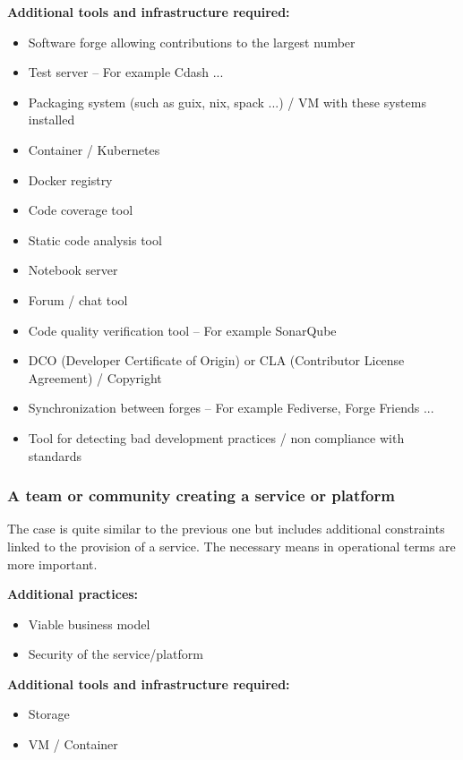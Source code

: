 {\bf Additional tools and infrastructure required:}
\begin{itemize}
\item Software forge allowing contributions to the largest number
\item Test server – For example Cdash ...
\item Packaging system (such as guix, nix, spack ...) / VM with these systems installed
\item Container / Kubernetes
\item Docker registry
\item Code coverage tool
\item Static code analysis tool
\item Notebook server
\item Forum / chat tool
\item Code quality verification tool – For example SonarQube
\item DCO (Developer Certificate of Origin) or CLA (Contributor License Agreement) / Copyright
\item Synchronization between forges – For example Fediverse, Forge Friends ...
\item Tool for detecting bad development practices / non compliance with
standards
\end{itemize}


\subsubsection{A team or community creating a service or platform}

The case is quite similar to the previous one but includes additional
constraints linked to the provision of a service. The necessary means
in operational terms are more important. 

{\bf Additional practices:}
\begin{itemize}
\item Viable business model
\item Security of the service/platform
\end{itemize}

{\bf Additional tools and infrastructure required:}
\begin{itemize}
\item Storage
\item VM / Container
\end{itemize}

